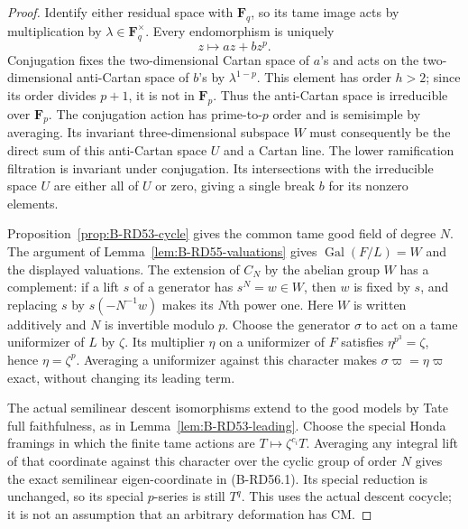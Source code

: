 \begin{proof}
Identify either residual space with $\mathbf F_q$, so its tame
image acts by multiplication by $\lambda\in\mathbf F_q^\times$.
Every endomorphism is uniquely
\[
                         z\longmapsto az+bz^p.
\]
Conjugation fixes the two-dimensional Cartan space of $a$'s and
acts on the two-dimensional anti-Cartan space of $b$'s by
$\lambda^{1-p}$. This element has order $h>2$; since its order
divides $p+1$, it is not in $\mathbf F_p$. Thus the anti-Cartan
space is irreducible over $\mathbf F_p$. The conjugation action
has prime-to-$p$ order and is semisimple by averaging. Its invariant
three-dimensional subspace $W$ must consequently be the direct
sum of this anti-Cartan space $U$ and a Cartan line.
The lower ramification filtration is invariant under conjugation.
Its intersections with the irreducible space $U$ are either all
of $U$ or zero, giving a single break $b$ for its nonzero elements.

Proposition~\ref{prop:B-RD53-cycle} gives the common tame good
field of degree $N$. The argument of Lemma~\ref{lem:B-RD55-valuations}
gives $\operatorname{Gal}(F/L)=W$ and the displayed valuations.
The extension of $C_N$ by the abelian group $W$ has a complement:
if a lift $s$ of a generator has $s^N=w\in W$, then $w$ is fixed
by $s$, and replacing $s$ by $s(-N^{-1}w)$ makes its $N$th power
one. Here $W$ is written additively and $N$ is invertible modulo $p$.
Choose the generator $\sigma$ to act on a tame uniformizer of $L$
by $\zeta$. Its multiplier $\eta$ on a uniformizer of $F$ satisfies
$\eta^{p^3}=\zeta$, hence $\eta=\zeta^p$. Averaging a uniformizer
against this character makes $\sigma\varpi=\eta\varpi$ exact,
without changing its leading term.

The actual semilinear descent isomorphisms extend to the good models
by Tate full faithfulness, as in Lemma~\ref{lem:B-RD53-leading}.
Choose the special Honda framings in which the finite tame actions
are $T\mapsto\zeta^{c_i}T$. Averaging any integral lift of that
coordinate against this character over the cyclic group of order
$N$ gives the exact semilinear eigen-coordinate in (B-RD56.1).
Its special reduction is unchanged, so its special $p$-series is
still $T^q$. This uses the actual descent cocycle; it is not an
assumption that an arbitrary deformation has CM.
\end{proof}

